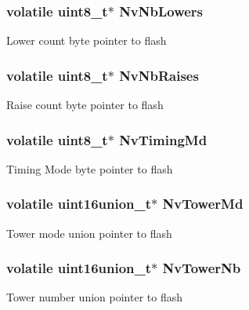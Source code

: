 \subsubsection[{Nv\+Nb\+Lowers}]{\setlength{\rightskip}{0pt plus 5cm}volatile uint8\+\_\+t$\ast$ Nv\+Nb\+Lowers}\label{group__main__module_ga06256289e4edfe7e871779cd6c059053}
Lower count byte pointer to flash \hypertarget{group__main__module_ga238e81a23614407f664e73f8a3d0b7fe}{}
\subsubsection[{Nv\+Nb\+Raises}]{\setlength{\rightskip}{0pt plus 5cm}volatile uint8\+\_\+t$\ast$ Nv\+Nb\+Raises}\label{group__main__module_ga238e81a23614407f664e73f8a3d0b7fe}
Raise count byte pointer to flash \hypertarget{group__main__module_ga574579db7eb4f4ab648d318e638fd615}{}
\subsubsection[{Nv\+Timing\+Md}]{\setlength{\rightskip}{0pt plus 5cm}volatile uint8\+\_\+t$\ast$ Nv\+Timing\+Md}\label{group__main__module_ga574579db7eb4f4ab648d318e638fd615}
Timing Mode byte pointer to flash \hypertarget{group__main__module_ga34f4a2041161f5c8cda7808c766d53d0}{}
\subsubsection[{Nv\+Tower\+Md}]{\setlength{\rightskip}{0pt plus 5cm}volatile {\bf uint16union\+\_\+t}$\ast$ Nv\+Tower\+Md}\label{group__main__module_ga34f4a2041161f5c8cda7808c766d53d0}
Tower mode union pointer to flash \hypertarget{group__main__module_ga65fc76be2b0895efd0e3ba05ce041c8b}{}
\subsubsection[{Nv\+Tower\+Nb}]{\setlength{\rightskip}{0pt plus 5cm}volatile {\bf uint16union\+\_\+t}$\ast$ Nv\+Tower\+Nb}\label{group__main__module_ga65fc76be2b0895efd0e3ba05ce041c8b}
Tower number union pointer to flash \hypertarget{group__main__module_ga590be3fd131777c613188298af1d7ebe}{}

